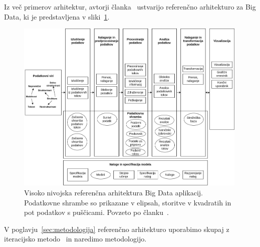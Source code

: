 \noindent Iz več primerov arhitektur, avtorji članka~\cite{reference_architecture_classification_technologies}
ustvarijo referenčno arhitekturo za Big Data, ki je predstavljena v sliki~\ref{fig:arch-ref-article}.

\begin{figure}[H]
    \centering
    \includegraphics[width=0.99\textwidth]{images/arhitektura/reference.png}
    \caption{Visoko nivojska referenčna arhitektura Big Data aplikacij.
        Podatkovne shrambe so prikazane v elipsah, storitve v kvadratih in
        pot podatkov s puščicami.
        Povzeto po članku~\cite{reference_architecture_classification_technologies}.}
    \label{fig:arch-ref-article}
\end{figure}

\noindent V poglavju~\ref{sec:metodologija} referenčno arhitekturo uporabimo skupaj z
iteracijsko metodo~\cite{iterative_methodology} in
naredimo metodologijo.